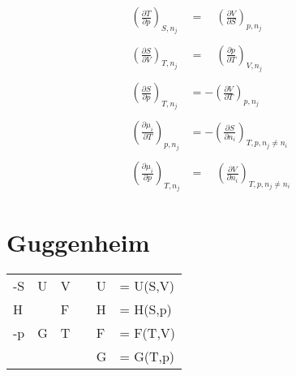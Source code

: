 \documentclass[twocolumn]{article}
\begin{document}
\begin{align*}
	\left(\frac{\partial T}{\partial p}\right)_{S,n_j}
	&= \quad
	\left(\frac{\partial V}{\partial S}\right)_{p,n_j}
	\\\\
	\left(\frac{\partial S}{\partial V}\right)_{T,n_j}
	&= \quad
	\left(\frac{\partial p}{\partial T}\right)_{V,n_j}
	\\\\
	\left(\frac{\partial S}{\partial p}\right)_{T,n_j}
	&= -
	\left(\frac{\partial V}{\partial T}\right)_{p,n_j}
	\\\\
	\left(\frac{\partial \mu _i}{\partial T}\right)_{p,n_j}
	&= -
	\left(\frac{\partial S}{\partial n_i}\right)_{T,p,n_j \neq n_i}
	\\\\
	\left(\frac{\partial \mu_i}{\partial p}\right)_{T,n_j}
	&=
	\quad \left(\frac{\partial V}{\partial n_i}\right)_{T,p,n_j \neq n_i}
\end{align*}
\section{Guggenheim}
\Large
\begin{tabular}{llllll}
	-S  & U  & V&			&U &= U(S,V) \\ 
	H &  &  F&       &H &= H(S,p) \\
	-p & G & T                &      &F &= F(T,V) \\
	 &  &                      &     &G &= G(T,p) \\
\end{tabular}
\normalsize
\end{document}

